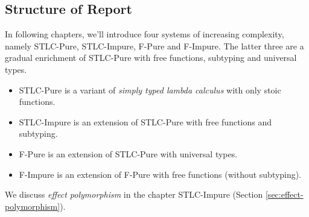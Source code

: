 \subsection{Structure of Report}

In following chapters, we'll introduce four systems of increasing
complexity, namely STLC-Pure, STLC-Impure, F-Pure and F-Impure. The
latter three are a gradual enrichment of STLC-Pure with free
functions, subtyping and universal types.

\begin{itemize}
\item STLC-Pure is a variant of \emph{simply typed lambda calculus}
  with only stoic functions.
\item STLC-Impure is an extension of STLC-Pure with free functions and subtyping.
\item F-Pure is an extension of STLC-Pure with universal types.
\item F-Impure is an extension of F-Pure with free functions (without subtyping).
\end{itemize}

We discuss \emph{effect polymorphism} in the chapter STLC-Impure
(Section \ref{sec:effect-polymorphism}).
